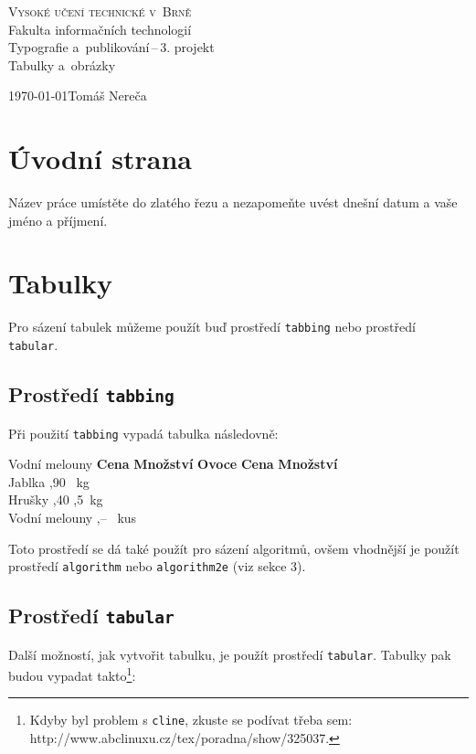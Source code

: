 \documentclass[a4paper, 11pt]{article}
\begin{document}
	\begin{titlepage}
		\begin{center}
			
			\textsc{\Huge Vysoké učení technické v~Brně\\[0.4em]}
				\huge Fakulta informačních technologií\\
			{\LARGE Typografie a~publikování\,--\,3. projekt\\[0.3em]}
				\Huge Tabulky a~obrázky\\
		\end{center}
		{\Large\today \hfill Tomáš Nereča}
	\end{titlepage}

\section{Úvodní strana}
Název práce umístěte do zlatého řezu a nezapomeňte uvést dnešní datum a vaše jméno a příjmení.

\section{Tabulky}
Pro sázení tabulek můžeme použít buď prostředí \texttt{tabbing} nebo prostředí \texttt{tabular}.

\subsection{Prostředí \texttt{tabbing}}
Při použití \texttt{tabbing} vypadá tabulka následovně:

\begin{tabbing}
	Vodní melouny \quad \= \textbf{Cena} \quad \= \textbf{Množství} \kill
	\textbf{Ovoce} \> \textbf{Cena} \> \textbf{Množství}\\
	Jablka ,90 \ kg\\
	Hrušky ,40 ,5\ kg\\
	Vodní melouny ,-- \ kus
\end{tabbing}

Toto prostředí se dá také použít pro sázení algoritmů, ovšem vhodnější je použít prostředí \texttt{algorithm} nebo
\texttt{algorithm2e} (viz sekce 3).

\subsection{Prostředí \texttt{tabular}}
Další možností, jak vytvořit tabulku, je použít prostředí \texttt{tabular}. Tabulky pak budou vypadat takto\footnote{Kdyby byl problem s \texttt{cline}, zkuste se podívat třeba sem: http://www.abclinuxu.cz/tex/poradna/show/325037.}:
\end{document}
